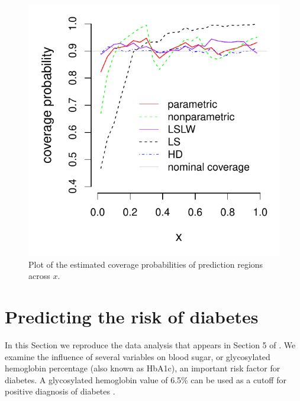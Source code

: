 \documentclass[11pt]{article}\usepackage[]{graphicx}\usepackage[]{color}
\makeatletter
\def\maxwidth{ %
  \ifdim\Gin@nat@width>\linewidth
    \linewidth
  \else
    \Gin@nat@width
  \fi
}
\newenvironment{knitrout}{}{} %
\makeatother
\begin{document}
\begin{figure}[h!]
\begin{center}
\begin{knitrout}
\color{fgcolor}
\includegraphics[width=\maxwidth]{figure/readme-inx-1} 

\end{knitrout}
\end{center}
\caption{Plot of the estimated coverage probabilities of prediction regions 
  across $x$.}
\label{Fig:coverageinx500.3}
\end{figure}




\newpage
\section{Predicting the risk of diabetes}
\label{sec:diabetes}

In this Section we reproduce the data analysis that appears in Section 5 of 
\citet{eck2019conformal}.  
We examine the influence of several variables on blood sugar, or glycosylated 
hemoglobin percentage (also known as HbA1c), an important risk factor for 
diabetes.  A glycosylated hemoglobin value of 6.5\% can be used as a cutoff 
for positive diagnosis of diabetes \citep{world2011use}. 
\end{document}
